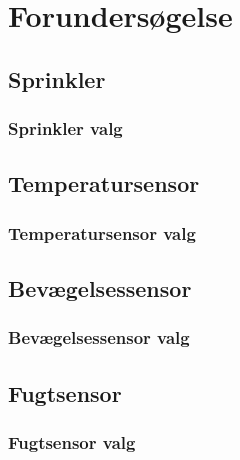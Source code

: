 \chapter{Forundersøgelse}

\section{Sprinkler}								%

\subsection{Sprinkler valg}						%

\section{Temperatursensor}						

\subsection{Temperatursensor valg}				%

\section{Bevægelsessensor}						

\subsection{Bevægelsessensor valg}				%

\section{Fugtsensor}						

\subsection{Fugtsensor valg}						%
